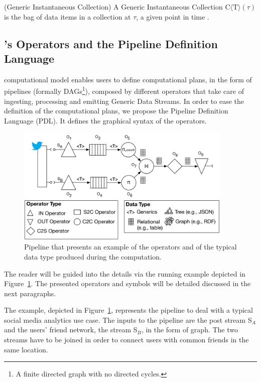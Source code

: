\begin{Definition}
(Generic Instantaneous Collection) A Generic Instantaneous Collection  C$\langle\mathrm{T}\rangle(\tau)$ is the bag of data items in a collection at $\tau$, a given point in time . 
\end{Definition}

\subsection{\texorpdfstring{\protect\river{}}{RIVER}'s Operators and the Pipeline Definition Language}\label{sec:comp-mod-sol-lang}

\river{} computational model enables users to define computational plans, in the form of pipelines (formally DAGs\footnote{A finite directed graph with no directed cycles.}), composed by different operators that take care of ingesting, processing and emitting Generic Data Streams.
In order to ease the definition of the computational plans, we propose the Pipeline Definition Language (PDL).
It defines the graphical syntax of the operators.

\begin{figure}[t]
  \centering
  \includegraphics[width=0.92\textwidth]{img/computational-model-syntax-example-ODL}
  \caption{Pipeline that presents an example of the operators and of the typical data type produced during the computation.}
  \label{fig:sti_ex}
\end{figure} 

The reader will be guided into the details via the running example depicted in Figure~\ref{fig:sti_ex}.
The presented operators and symbols will be detailed discussed in the next paragraphs.

\begin{Example}
The example, depicted in Figure~\ref{fig:sti_ex}, represents the pipeline to deal with a typical social media analytics use case.
The inputs to the pipeline are the post stream S$_A$ and the users' friend network, the stream S$_B$, in the form of graph. The two streams have to be joined in order to connect users with common friends in the same location.
\end{Example}
 
